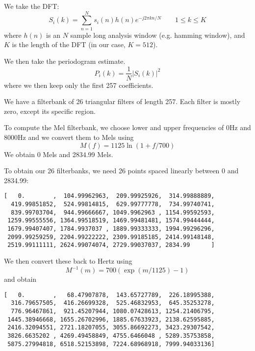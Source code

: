 \documentclass{article}
\begin{document}
We take the DFT:
\begin{equation}
S_i(k) = \sum_{n=1}^N s_i(n)h(n)e^{-j2\pi kn/N}\qquad1\leq k\leq K
\end{equation}
where $h(n)$ is an $N$ sample long analysis window (e.g. hamming window), and $K$ is the length of the DFT (in our case, $K=512$).

We then take the periodogram estimate.
\begin{equation}
P_i(k) = \frac{1}{N}\left|S_i(k)\right|^2
\end{equation}
where we then keep only the first 257 coefficients.

We have a filterbank of 26 triangular filters of length 257. Each filter is mostly zero, except its specific region.

To compute the Mel filterbank, we choose lower and upper frequencies of 0Hz and 8000Hz and we convert them to Mels using
\begin{equation}
M(f) = 1125\ln\left(1 + f/700\right)
\end{equation}
We obtain 0 Mels and 2834.99 Mels.

To obtain our 26 filterbanks, we need 26 points spaced linearly between 0 and 2834.99:
\begin{verbatim}
[   0.        ,  104.99962963,  209.99925926,  314.99888889,
  419.99851852,  524.99814815,  629.99777778,  734.99740741,
  839.99703704,  944.99666667, 1049.9962963 , 1154.99592593,
 1259.99555556, 1364.99518519, 1469.99481481, 1574.99444444,
 1679.99407407, 1784.9937037 , 1889.99333333, 1994.99296296,
 2099.99259259, 2204.99222222, 2309.99185185, 2414.99148148,
 2519.99111111, 2624.99074074, 2729.99037037, 2834.99      ]
\end{verbatim}

We then convert these back to Hertz using
\begin{equation}
M^{-1}(m) = 700\left(\exp\left(m/1125\right)-1\right)
\end{equation}
and obtain
\begin{verbatim}
[   0.        ,   68.47907878,  143.65727789,  226.18995388,
  316.79657505,  416.26699328,  525.46832953,  645.35253278,
  776.96467861,  921.45207944, 1080.07428613, 1254.21406795,
 1445.38946668, 1655.26702996, 1885.67633923, 2138.62595885,
 2416.32094551, 2721.18207055, 3055.86692273, 3423.29307542,
 3826.6635202 , 4269.49458849, 4755.6466048 , 5289.35753858,
 5875.27994818, 6518.52153898, 7224.68968918, 7999.94033136]
\end{verbatim}
\end{document}

